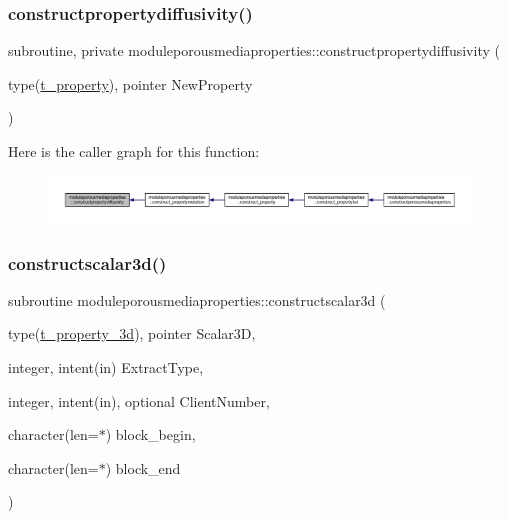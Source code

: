 \mbox{\label{namespacemoduleporousmediaproperties_a03d5423382489d1918532f58f478c446}} 
\subsubsection{\texorpdfstring{constructpropertydiffusivity()}{constructpropertydiffusivity()}}
{\footnotesize\ttfamily subroutine, private moduleporousmediaproperties\+::constructpropertydiffusivity (\begin{DoxyParamCaption}\item[{type(\mbox{\hyperlink{structmoduleporousmediaproperties_1_1t__property}{t\+\_\+property}}), pointer}]{New\+Property }\end{DoxyParamCaption})\hspace{0.3cm}{\ttfamily [private]}}

Here is the caller graph for this function\+:\nopagebreak
\begin{figure}[H]
\begin{center}
\leavevmode
\includegraphics[width=350pt]{namespacemoduleporousmediaproperties_a03d5423382489d1918532f58f478c446_icgraph}
\end{center}
\end{figure}
\mbox{\label{namespacemoduleporousmediaproperties_a720c9abb0cbd672dacfd23a18a959f50}} 
\subsubsection{\texorpdfstring{constructscalar3d()}{constructscalar3d()}}
{\footnotesize\ttfamily subroutine moduleporousmediaproperties\+::constructscalar3d (\begin{DoxyParamCaption}\item[{type(\mbox{\hyperlink{structmoduleporousmediaproperties_1_1t__property__3d}{t\+\_\+property\+\_\+3d}}), pointer}]{Scalar3D,  }\item[{integer, intent(in)}]{Extract\+Type,  }\item[{integer, intent(in), optional}]{Client\+Number,  }\item[{character(len=$\ast$)}]{block\+\_\+begin,  }\item[{character(len=$\ast$)}]{block\+\_\+end }\end{DoxyParamCaption})\hspace{0.3cm}{\ttfamily [private]}}

